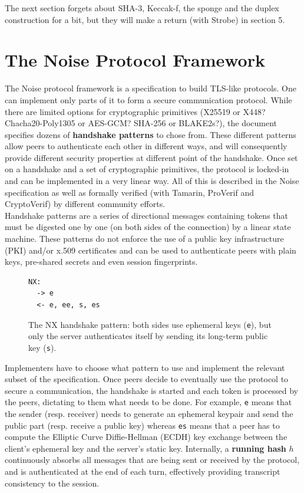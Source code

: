 \documentclass{article}
\begin{document}
The next section forgets about SHA-3, Keccak-f, the sponge and the duplex construction for a bit, but they will make a return (with Strobe) in section 5.

\section{The Noise Protocol Framework}

The Noise protocol framework is a specification\cite{noise} to build TLS-like protocols. One can implement only parts of it to form a secure communication protocol. While there are limited options for cryptographic primitives (X25519 or X448? Chacha20-Poly1305 or AES-GCM? SHA-256 or BLAKE2s?), the document specifies dozens of \textbf{handshake patterns} to chose from. These different patterns allow peers to authenticate each other in different ways, and will consequently provide different security properties at different point of the handshake. Once set on a handshake and a set of cryptographic primitives, the protocol is locked-in and can be implemented in a very linear way. All of this is described in the Noise specification as well as formally verified (with Tamarin\cite{tamarin}, ProVerif\cite{noiseexplorer} and CryptoVerif\cite{cryptoverif}) by different community efforts.\\

Handshake patterns are a series of directional messages containing tokens that must be digested one by one (on both sides of the connection) by a linear state machine. These patterns do not enforce the use of a public key infrastructure (PKI) and/or x.509 certificates and can be used to authenticate peers with plain keys, pre-shared secrets and even session fingerprints.\\

\begin{figure}[H]
\centering
\begin{BVerbatim}
NX:
  -> e
  <- e, ee, s, es
\end{BVerbatim}
\caption{The NX handshake pattern: both sides use ephemeral keys (\texttt{e}), but only the server authenticates itself by sending its long-term public key (\texttt{s}).}
\end{figure}

Implementers have to choose what pattern to use and implement the relevant subset of the specification. Once peers decide to eventually use the protocol to secure a communication, the handshake is started and each token is processed by the peers, dictating to them what needs to be done. For example, \texttt{e} means that the sender (resp. receiver) needs to generate an ephemeral keypair and send the public part (resp. receive a public key) whereas \texttt{es} means that a peer has to compute the Elliptic Curve Diffie-Hellman (ECDH) key exchange between the client's ephemeral key and the server's static key. Internally, a \textbf{running hash} $h$ continuously absorbs all messages that are being sent or received by the protocol, and is authenticated at the end of each turn, effectively providing transcript consistency to the session.
\end{document}
